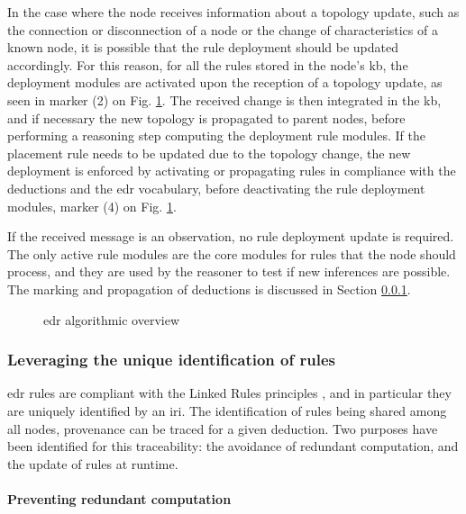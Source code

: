 \documentclass[sw]{iosart2x}
\begin{document}
In the case where the node receives information about a topology update, such as the connection or disconnection of a node or the change of characteristics of a known node, it is possible that the rule deployment should be updated accordingly.
For this reason, for all the rules stored in the node's \gls{kb}, the deployment modules are activated upon the reception of a topology update, as seen in marker (2) on Fig. \ref{fig:edr_algo}.
The received change is then integrated in the \gls{kb}, and if necessary the new topology is propagated to parent nodes, before performing a reasoning step computing the deployment rule modules.
If the placement rule needs to be updated due to the topology change, the new deployment is enforced by activating or propagating rules in compliance with the deductions and the \gls{edr} vocabulary, before deactivating the rule deployment modules, marker (4) on Fig. \ref{fig:edr_algo}.

If the received message is an observation, no rule deployment update is required. 
The only active rule modules are the core modules for rules that the node should process, and they are used by the reasoner to test if new inferences are possible.
The marking and propagation of deductions is discussed in Section \textsection \ref{subsubs:unique_identification}.

\begin{figure}
	\centering
	\caption{\gls{edr} algorithmic overview}
	\label{fig:edr_algo}
	\scalebox{0.7}{
			
	}
\end{figure}

\subsubsection{Leveraging the unique identification of rules}
\label{subsubs:unique_identification}

\gls{edr} rules are compliant with the Linked Rules principles \cite{Khandelwal2011}, and in particular they are uniquely identified by an \gls{iri}.
The identification of rules being shared among all nodes, provenance can be traced for a given deduction.
Two purposes have been identified for this traceability: the avoidance of redundant computation, and the update of rules at runtime.

\paragraph{Preventing redundant computation} 
\end{document}
